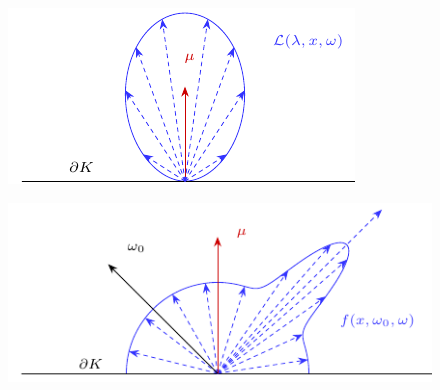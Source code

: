 	\begin{figure}[h]
		\center
		\includegraphics{gg_fig/radiance_1.pdf}
		\caption{}
	\end{figure}

	\begin{figure}[h]
		\center
		\includegraphics{gg_fig/brdf_1.pdf}
		\caption{}
	\end{figure}


